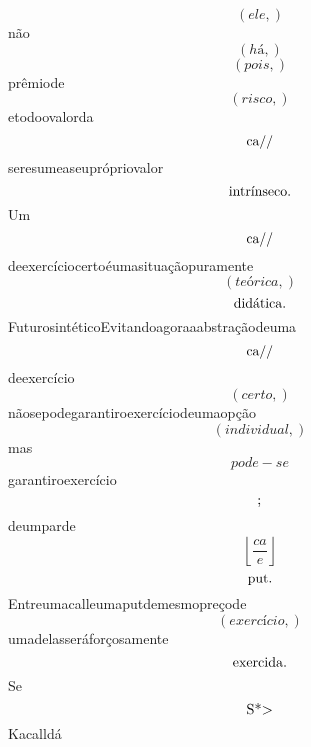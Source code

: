 \documentclass{article}
\begin{document}
\begin{equation}
\left( ele,\right)
\end{equation}não\begin{equation}
\left( há,\right)
\end{equation}\begin{equation}
\left( pois,\right)
\end{equation}prêmiode\begin{equation}
\left( risco,\right)
\end{equation}etodoovalorda\begin{equation}
$ca//$
\end{equation}seresumeaseuprópriovalor\begin{equation}
$intrínseco.$
\end{equation}Um\begin{equation}
$ca//$
\end{equation}deexercíciocertoéumasituaçãopuramente\begin{equation}
\left( teórica,\right)
\end{equation}\begin{equation}
$didática.$
\end{equation}FuturosintéticoEvitandoagoraaabstraçãodeuma\begin{equation}
$ca//$
\end{equation}deexercício\begin{equation}
\left( certo,\right)
\end{equation}nãosepodegarantiroexercíciodeumaopção\begin{equation}
\left( individual,\right)
\end{equation}mas\begin{equation}
pode - se
\end{equation}garantiroexercício\begin{equation}
$;$
\end{equation}deumparde\begin{equation}
\left\lfloor{\frac{ca}{e}}\right\rfloor
\end{equation}\begin{equation}
$put.$
\end{equation}Entreumacalleumaputdemesmopreçode\begin{equation}
\left( exercício,\right)
\end{equation}umadelasseráforçosamente\begin{equation}
$exercida.$
\end{equation}Se\begin{equation}
$S*>$
\end{equation}Kacalldá\begin{equation}

\end{equation}
\end{document}
